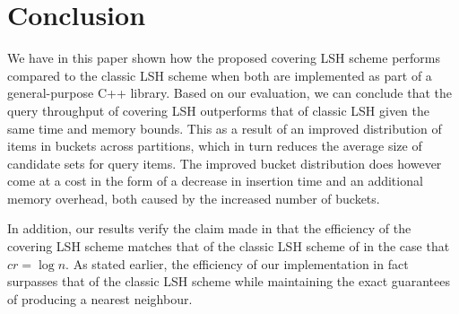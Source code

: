 \section{Conclusion}
\label{conclusion}

We have in this paper shown how the proposed covering LSH scheme performs compared to the classic LSH scheme when both are implemented as part of a general-purpose C++ library. Based on our evaluation, we can conclude that the query throughput of covering LSH outperforms that of classic LSH given the same time and memory bounds. This as a result of an improved distribution of items in buckets across partitions, which in turn reduces the average size of candidate sets for query items. The improved bucket distribution does however come at a cost in the form of a decrease in insertion time and an additional memory overhead, both caused by the increased number of buckets.

In addition, our results verify the claim made in \cite{DBLP:journals/corr/Pagh15} that the efficiency of the covering LSH scheme matches that of the classic LSH scheme of \cite{DBLP:conf/stoc/IndykM98} in the case that $cr = \log n$. As stated earlier, the efficiency of our implementation in fact surpasses that of the classic LSH scheme while maintaining the exact guarantees of producing a nearest neighbour.
